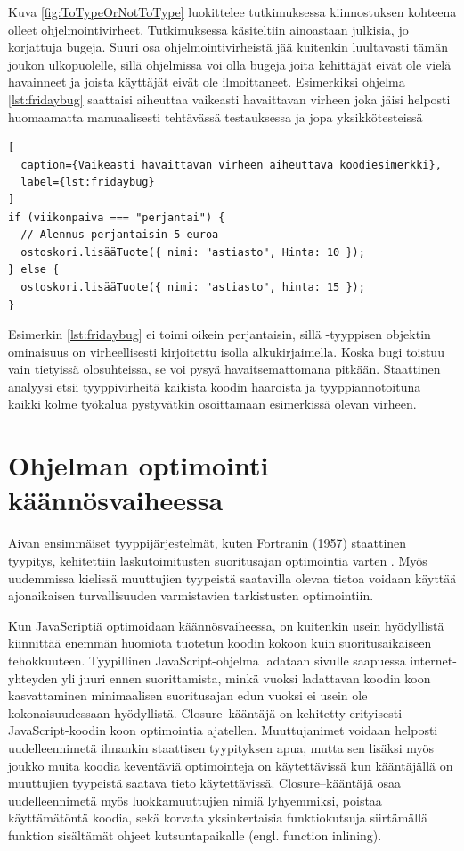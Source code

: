 Kuva \ref{fig:ToTypeOrNotToType} luokittelee
tutkimuksessa \cite{ToTypeOrNotToType} kiinnostuksen kohteena
olleet ohjelmointivirheet. Tutkimuksessa käsiteltiin ainoastaan
julkisia, jo korjattuja bugeja. Suuri osa ohjelmointivirheistä jää
kuitenkin luultavasti tämän joukon ulkopuolelle, sillä ohjelmissa voi
olla bugeja joita kehittäjät eivät ole vielä havainneet ja joista
käyttäjät eivät ole ilmoittaneet. Esimerkiksi ohjelma \ref{lst:fridaybug}
saattaisi aiheuttaa vaikeasti havaittavan virheen joka jäisi helposti 
huomaamatta manuaalisesti tehtävässä testauksessa ja jopa yksikkötesteissä
\begin{lstlisting}[
  caption={Vaikeasti havaittavan virheen aiheuttava koodiesimerkki},
  label={lst:fridaybug}
]
if (viikonpaiva === "perjantai") {
  // Alennus perjantaisin 5 euroa
  ostoskori.lisääTuote({ nimi: "astiasto", Hinta: 10 });
} else {
  ostoskori.lisääTuote({ nimi: "astiasto", hinta: 15 });
}
\end{lstlisting}
Esimerkin \ref{lst:fridaybug} ei toimi oikein perjantaisin, sillä -tyyppisen
objektin ominaisuus  on virheellisesti kirjoitettu isolla
alkukirjaimella. Koska bugi toistuu vain tietyissä olosuhteissa, se voi pysyä
havaitsemattomana pitkään. Staattinen analyysi etsii tyyppivirheitä
kaikista koodin haaroista ja tyyppiannotoituna kaikki kolme työkalua
pystyvätkin osoittamaan esimerkissä olevan virheen.

\section{Ohjelman optimointi käännösvaiheessa}
Aivan ensimmäiset tyyppijärjestelmät, kuten Fortranin (1957) staattinen tyypitys,
kehitettiin laskutoimitusten suoritusajan optimointia varten \cite{TypesAndProgrammingLanguages}.
Myös uudemmissa kielissä muuttujien tyypeistä saatavilla olevaa tietoa
voidaan käyttää ajonaikaisen turvallisuuden varmistavien tarkistusten
optimointiin.

Kun JavaScriptiä optimoidaan käännösvaiheessa, on kuitenkin usein hyödyllistä
kiinnittää enemmän huomiota tuotetun koodin kokoon kuin suoritusaikaiseen
tehokkuuteen. Tyypillinen JavaScript-ohjelma ladataan sivulle saapuessa
internet-yhteyden yli juuri ennen suorittamista, minkä vuoksi ladattavan
koodin koon kasvattaminen minimaalisen suoritusajan edun vuoksi ei usein ole
kokonaisuudessaan hyödyllistä. Closure–kääntäjä on kehitetty erityisesti
JavaScript-koodin koon optimointia ajatellen. Muuttujanimet voidaan helposti
uudelleennimetä ilmankin staattisen tyypityksen apua, mutta sen lisäksi myös
joukko muita koodia keventäviä optimointeja on käytettävissä kun kääntäjällä
on muuttujien tyypeistä saatava tieto käytettävissä. Closure–kääntäjä osaa
uudelleennimetä myös luokkamuuttujien nimiä lyhyemmiksi, poistaa
käyttämätöntä koodia, sekä korvata yksinkertaisia funktiokutsuja siirtämällä
funktion sisältämät ohjeet kutsuntapaikalle (engl. function inlining).

